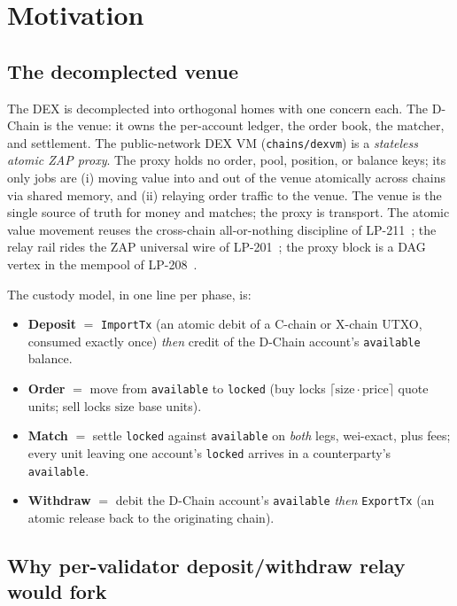 \section{Motivation}

\subsection{The decomplected venue}

The DEX is decomplected into orthogonal homes with one concern each.
The D-Chain is the venue: it owns the per-account ledger, the order
book, the matcher, and settlement. The public-network DEX VM
(\texttt{chains/dexvm}) is a \emph{stateless atomic ZAP proxy}. The
proxy holds no order, pool, position, or balance keys; its only jobs
are (i) moving value into and out of the venue atomically across
chains via shared memory, and (ii) relaying order traffic to the
venue. The venue is the single source of truth for money and matches;
the proxy is transport. The atomic value movement reuses the cross-chain
all-or-nothing discipline of LP-211~\cite{lp211}; the relay rail rides the
ZAP universal wire of LP-201~\cite{lp201}; the proxy block is a DAG vertex in
the mempool of LP-208~\cite{lp208}.

The custody model, in one line per phase, is:

\begin{itemize}[leftmargin=2em,nosep]
\item \textbf{Deposit} $=$ \texttt{ImportTx} (an atomic debit of a
  C-chain or X-chain UTXO, consumed exactly once) \emph{then} credit
  of the D-Chain account's \texttt{available} balance.
\item \textbf{Order} $=$ move from \texttt{available} to
  \texttt{locked} (buy locks $\lceil \mathrm{size}\cdot\mathrm{price}
  \rceil$ quote units; sell locks $\mathrm{size}$ base units).
\item \textbf{Match} $=$ settle \texttt{locked} against
  \texttt{available} on \emph{both} legs, wei-exact, plus fees; every
  unit leaving one account's \texttt{locked} arrives in a
  counterparty's \texttt{available}.
\item \textbf{Withdraw} $=$ debit the D-Chain account's
  \texttt{available} \emph{then} \texttt{ExportTx} (an atomic release
  back to the originating chain).
\end{itemize}

\subsection{Why per-validator deposit/withdraw relay would fork}

